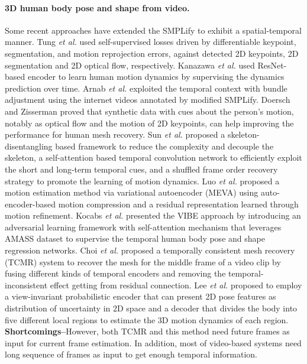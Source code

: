 \documentclass[10pt,twocolumn,letterpaper]{article}
\begin{document}
\paragraph{3D human body pose and shape from video.}
Some recent approaches have extended the SMPLify to exhibit a spatial-temporal manner. Tung \textit{et al.} \cite{tung2017self} used self-supervised losses driven by differentiable keypoint, segmentation, and motion reprojection errors, against detected 2D keypoints, 2D segmentation and 2D optical flow, respectively. Kanazawa \textit{et al.} \cite{kanazawa2019learning} used ResNet-based encoder \cite{he2016identity} to learn human motion dynamics by supervising the dynamics prediction over time. Arnab \textit{et al.} \cite{arnab2019exploiting} exploited the temporal context with bundle adjustment using the internet videos annotated by modified SMPLify. Doersch and Zisserman \cite{doersch2019sim2real} proved that synthetic data with cues about the person's motion, notably
as optical flow and the motion of 2D keypoints, can help improving the performance for human mesh recovery. Sun \textit{et al.} \cite{sun2019human} proposed a skeleton-disentangling based framework to reduce the complexity and decouple the skeleton, a self-attention based temporal convolution network to efficiently exploit the short and long-term temporal cues, and a shuffled frame order recovery strategy to promote the learning of motion dynamics. Luo \textit{et al.} \cite{luo20203d} proposed a motion estimation method via variational autoencoder (MEVA) using auto-encoder-based motion compression and a residual representation learned through motion refinement. Kocabs \textit{et al.} presented the VIBE \cite{kocabas2020vibe} approach by introducing an adversarial learning framework with self-attention mechanism that leverages AMASS dataset \cite{mahmood2019amass} to supervise the temporal human body pose and shape regression networks. Choi \textit{et al.} proposed a temporally consistent mesh recovery (TCMR) \cite{choi2021beyond} system to recover the mesh for the middle frame of a video clip by fusing different kinds of temporal encoders and removing the temporal-inconsistent effect getting from residual connection. Lee \textit{et al.} \cite{lee2021uncertainty} proposed to employ a view-invariant probabilistic encoder that can present 2D pose features as distribution of uncertainty in 2D space and a decoder that divides the body into five different local regions to estimate the 3D motion dynamics of each region.  \textbf{Shortcomings--}However, both TCMR and this method need future frames as input for current frame estimation.  In addition, most of video-based systems need long sequence of frames as input to get enough temporal information.
\end{document}
